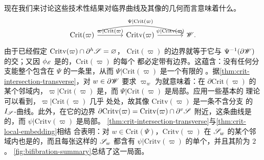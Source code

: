 现在我们来讨论这些技术性结果对临界曲线及其像的几何而言意味着什么。
\begin{equation*}
\begin{tikzcd}[column sep=large]
\mathrm{Crit}(\varpi) \ar[r,"\varpi|\mathrm{Crit}(\varpi)"]
 \ar[rr,bend left=15,"\Psi|\mathrm{Crit}(\varpi)"]
 & \mathrm{Critv}(\varpi) \ar[r,"\psi|\mathrm{Critv}(\varpi)"] & \scr{W}.
\end{tikzcd}
\end{equation*}
由于已经假定 $\mathrm{Critv}(\varpi)\cap\partial^h\mathscr{S}=\varnothing$，
$\mathrm{Crit}(\varpi)$ 的边界就等于它与 $\Psi^{-1}(\partial\mathscr{W})$
的交；又因 $\phi_{\mathscr{E}}$ 是\trExact{}的，$\mathrm{Crit}(\varpi)$ 的每个%
\trConnectedComponent{}都必定带有边界。这蕴含：没有任何分支能整个包含在
$\Psi$ 的一条\trFiber{}里，从而 $\Psi|\mathrm{Crit}(\varpi)$ 是一个有限的%
\trBranchedCover。据\cref{thm:crit-intersection-transverse}，对
$w\in\partial\mathscr{W}$ 要求 $\varpi_w$ 为\trLefschetzFibration{}就意味着：在
$\partial\mathrm{Crit}(\varpi)$ 的某个邻域内，$\varpi|\mathrm{Crit}(\varpi)$
是\trEmbedding，而 $\Psi|\mathrm{Crit}(\varpi)$ 是局部\trIsomorphism。应用一些基本的%
\trPseudoholomorphicCurve{}理论可以看到，$\varpi|\mathrm{Crit}(\varpi)$ 几乎
处处\trInjective，故其像 $\mathrm{Critv}(\varpi)$ 是一条不含\trMultipleCover{}分支
的 $I_{\mathscr{S}}$-\trHolomorphic{}曲线。此外，在它的边界
$\partial\mathrm{Critv}(\varpi)=\mathrm{Critv}(\varpi)\cap\partial^v\mathscr{S}$
附近，这条曲线是\trSmooth{}的，而 $\psi|\mathrm{Critv}(\varpi)$ 是局部\trIsomorphism。%
\cref{thm:crit-intersection-transverse}与\cref{thm:crit-local-embedding}相结
合表明：对 $w\in\mathrm{Crit}(\Psi)$，$\mathrm{Critv}(\varpi)$ 在 $\mathscr{S}_w$
的某个邻域内也是\trSmooth{}的，而且每张这样的 $\mathscr{S}_w$ 都含有
$\psi|\mathrm{Critv}(\varpi)$ 的单个\trBranchPoint，并且其阶为 $2$。%
\cref{fig:bifibration-summary}总结了这一局面。
